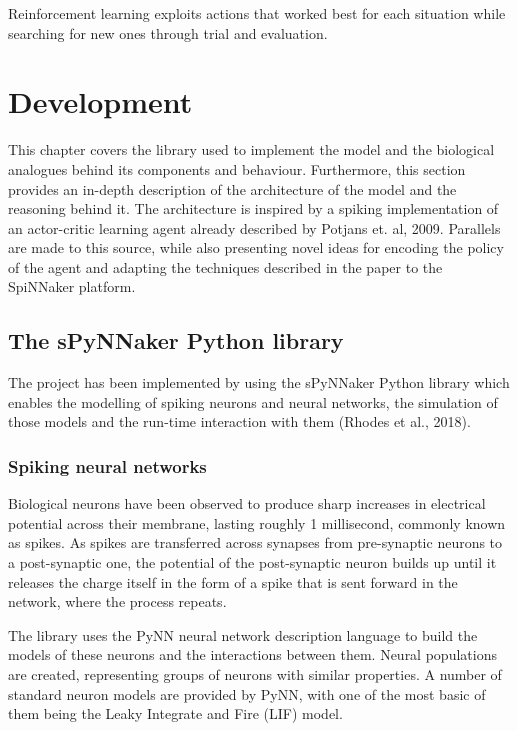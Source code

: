 \documentclass[10pt]{article}
\begin{document}
    Reinforcement learning exploits actions that worked best for each situation while searching for new ones through trial and evaluation.
    
    \section{Development}

    This chapter covers the library used to implement the model and the biological analogues behind its components and behaviour. Furthermore, this section provides an in-depth description of the architecture of the model and the reasoning behind it. The architecture is inspired by a spiking implementation of an actor-critic learning agent already described by Potjans et. al, 2009. Parallels are made to this source, while also presenting novel ideas for encoding the policy of the agent and adapting the techniques described in the paper to the SpiNNaker platform.

    \subsection{The sPyNNaker Python library}

    The project has been implemented by using the sPyNNaker Python library which enables the modelling of spiking neurons and neural networks, the simulation of those models and the run-time interaction with them (Rhodes et al., 2018).

    \subsubsection{Spiking neural networks}

    Biological neurons have been observed to produce sharp increases in electrical potential across their membrane, lasting roughly 1 millisecond, commonly known as spikes. As spikes are transferred across synapses from pre-synaptic neurons to a post-synaptic one, the potential of the post-synaptic neuron builds up until it releases the charge itself in the form of a spike that is sent forward in the network, where the process repeats.

    The library uses the PyNN neural network description language to build the models of these neurons and the interactions between them. Neural populations are created, representing groups of neurons with similar properties. A number of standard neuron models are provided by PyNN, with one of the most basic of them being the Leaky Integrate and Fire (LIF) model. 
    
\end{document}
